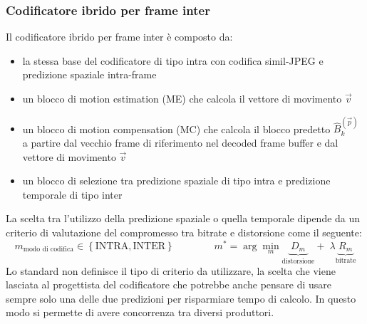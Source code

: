 \begin{figure}[htbp]
\end{figure}

\subsubsection*{Codificatore ibrido per frame inter}
Il codificatore ibrido per frame inter è composto da:
\begin{itemize}
	\item la stessa base del codificatore di tipo intra con codifica simil-JPEG e predizione spaziale intra-frame
	\item un blocco di motion estimation (ME) che calcola il vettore di movimento \(\vec{v}\)
	\item un blocco di motion compensation (MC) che calcola il blocco predetto \(\hat{B}_k^{(\vec{p})}\) a partire dal
	vecchio frame di riferimento nel decoded frame buffer e dal vettore di movimento \(\vec{v}\)
	\item un blocco di selezione tra predizione spaziale di tipo intra e predizione temporale di tipo inter
\end{itemize}

\noindent
La scelta tra l'utilizzo della predizione spaziale o quella temporale dipende da un criterio di valutazione del
compromesso tra bitrate e distorsione come il seguente:
\[m_\text{modo di codifica} \in \left\{ \text{INTRA}, \text{INTER} \right\} \qquad\qquad m^* = \arg\min_{m} \! \underbrace{\, D_m \,}_\text{distorsione} \! + \; \lambda \! \underbrace{\, R_m \,}_\text{bitrate} \]
Lo standard non definisce il tipo di criterio da utilizzare, la scelta che viene lasciata al progettista del
codificatore che potrebbe anche pensare di usare sempre solo una delle due predizioni per risparmiare tempo
di calcolo. In questo modo si permette di avere concorrenza tra diversi produttori.


